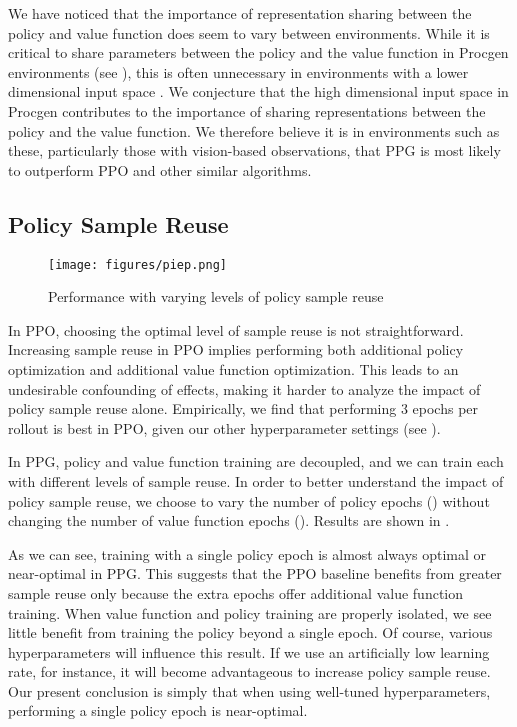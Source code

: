 \documentclass{article}
\begin{document}
We have noticed that the importance of representation sharing between the policy and value function does seem to vary between environments. While it is critical to share parameters between the policy and the value function in Procgen environments (see ), this is often unnecessary in environments with a lower dimensional input space \citep{sac}. We conjecture that the high dimensional input space in Procgen contributes to the importance of sharing representations between the policy and the value function. We therefore believe it is in environments such as these, particularly those with vision-based observations, that PPG is most likely to outperform PPO and other similar algorithms.

\subsection{Policy Sample Reuse} \label{sec:policy_sr}

\begin{figure*}
\centering
\texttt{[image: figures/piep.png]}
\caption{Performance with varying levels of policy sample reuse}
\label{fig:pi_sample_reuse}
\end{figure*}

In PPO, choosing the optimal level of sample reuse is not straightforward. Increasing sample reuse in PPO implies performing both additional policy optimization and additional value function optimization. This leads to an undesirable confounding of effects, making it harder to analyze the impact of policy sample reuse alone. Empirically, we find that performing 3 epochs per rollout is best in PPO, given our other hyperparameter settings (see ).

In PPG, policy and value function training are decoupled, and we can train each with different levels of sample reuse. In order to better understand the impact of policy sample reuse, we choose to vary the number of policy epochs () without changing the number of value function epochs (). Results are shown in .

As we can see, training with a single policy epoch is almost always optimal or near-optimal in PPG. This suggests that the PPO baseline benefits from greater sample reuse only because the extra epochs offer additional value function training. When value function and policy training are properly isolated, we see little benefit from training the policy beyond a single epoch. Of course, various hyperparameters will influence this result. If we use an artificially low learning rate, for instance, it will become advantageous to increase policy sample reuse. Our present conclusion is simply that when using well-tuned hyperparameters, performing a single policy epoch is near-optimal.
\end{document}
